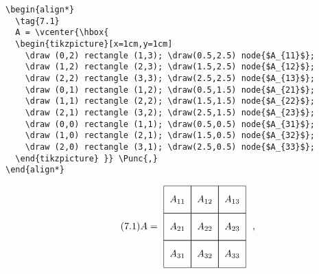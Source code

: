\documentclass[paper=a4, fontsize=11pt]{scrreprt}%
\newcommand{\Punc}[1]{~#1}
\begin{document}
\begin{verbatim}
\begin{align*}
  \tag{7.1}
  A = \vcenter{\hbox{
  \begin{tikzpicture}[x=1cm,y=1cm]
    \draw (0,2) rectangle (1,3); \draw(0.5,2.5) node{$A_{11}$};
    \draw (1,2) rectangle (2,3); \draw(1.5,2.5) node{$A_{12}$};
    \draw (2,2) rectangle (3,3); \draw(2.5,2.5) node{$A_{13}$};
    \draw (0,1) rectangle (1,2); \draw(0.5,1.5) node{$A_{21}$};
    \draw (1,1) rectangle (2,2); \draw(1.5,1.5) node{$A_{22}$};
    \draw (2,1) rectangle (3,2); \draw(2.5,1.5) node{$A_{23}$};
    \draw (0,0) rectangle (1,1); \draw(0.5,0.5) node{$A_{31}$};
    \draw (1,0) rectangle (2,1); \draw(1.5,0.5) node{$A_{32}$};
    \draw (2,0) rectangle (3,1); \draw(2.5,0.5) node{$A_{33}$};
  \end{tikzpicture} }} \Punc{,}
\end{align*}
\end{verbatim}

\begin{align*}
  \tag{7.1}
  A = \vcenter{\hbox{
  \begin{tikzpicture}[x=1cm,y=1cm]
    \draw (0,2) rectangle (1,3); \draw(0.5,2.5) node{$A_{11}$};
    \draw (1,2) rectangle (2,3); \draw(1.5,2.5) node{$A_{12}$};
    \draw (2,2) rectangle (3,3); \draw(2.5,2.5) node{$A_{13}$};
    \draw (0,1) rectangle (1,2); \draw(0.5,1.5) node{$A_{21}$};
    \draw (1,1) rectangle (2,2); \draw(1.5,1.5) node{$A_{22}$};
    \draw (2,1) rectangle (3,2); \draw(2.5,1.5) node{$A_{23}$};
    \draw (0,0) rectangle (1,1); \draw(0.5,0.5) node{$A_{31}$};
    \draw (1,0) rectangle (2,1); \draw(1.5,0.5) node{$A_{32}$};
    \draw (2,0) rectangle (3,1); \draw(2.5,0.5) node{$A_{33}$};
  \end{tikzpicture} }} \Punc{,}
\end{align*}
\end{document}
